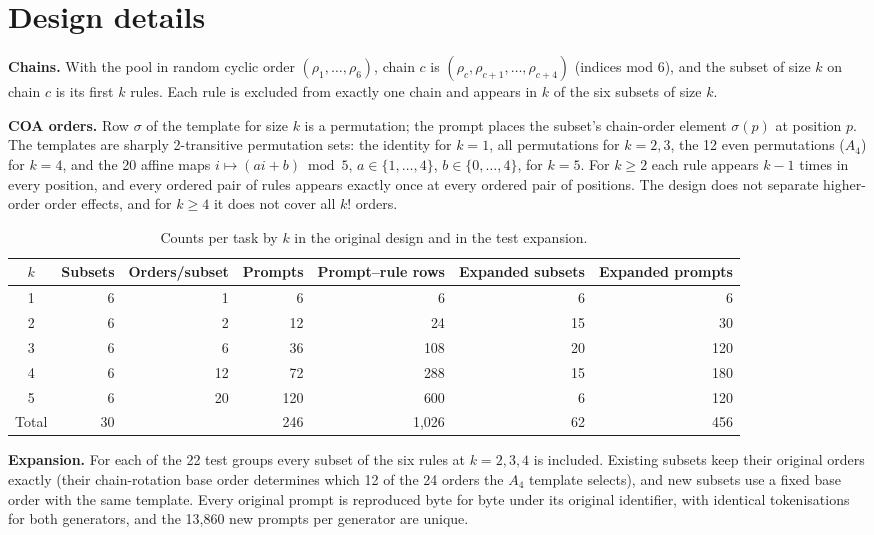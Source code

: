 \documentclass{article}
\begin{document}
\section{Design details}
\label{app:design}

\textbf{Chains.} With the pool in random cyclic order $(\rho_1,\dots,\rho_6)$, chain $c$ is $(\rho_c,\rho_{c+1},\dots,
\rho_{c+4})$ (indices mod 6), and the subset of size $k$ on chain $c$ is its first $k$ rules. Each rule is excluded from
exactly one chain and appears in $k$ of the six subsets of size $k$.

\textbf{COA orders.} Row $\sigma$ of the template for size $k$ is a permutation; the prompt places the subset's
chain-order element $\sigma(p)$ at position $p$. The templates are sharply 2-transitive permutation sets: the identity
for $k=1$, all permutations for $k=2,3$, the 12 even permutations ($A_4$) for $k=4$, and the 20 affine maps
$i\mapsto(ai+b)\bmod 5$, $a\in\{1,\dots,4\}$, $b\in\{0,\dots,4\}$, for $k=5$. For $k\ge2$ each rule appears $k-1$ times
in every position, and every ordered pair of rules appears exactly once at every ordered pair of positions. The design
does not separate higher-order order effects, and for $k\ge4$ it does not cover all $k!$ orders.

\begin{table}[h]
\centering\small
\caption{Counts per task by $k$ in the original design and in the test expansion.}
\label{tab:perk}
\setlength{\tabcolsep}{4pt}\footnotesize
\begin{tabular}{crrrrrr}
\toprule
$k$ & Subsets & Orders/subset & Prompts & Prompt--rule rows & Expanded subsets & Expanded prompts \\
\midrule
1 & 6 & 1 & 6 & 6 & 6 & 6 \\
2 & 6 & 2 & 12 & 24 & 15 & 30 \\
3 & 6 & 6 & 36 & 108 & 20 & 120 \\
4 & 6 & 12 & 72 & 288 & 15 & 180 \\
5 & 6 & 20 & 120 & 600 & 6 & 120 \\
\midrule
Total & 30 & & 246 & 1,026 & 62 & 456 \\
\bottomrule
\end{tabular}
\end{table}

\textbf{Expansion.} For each of the 22 test groups every subset of the six rules at $k=2,3,4$ is included. Existing
subsets keep their original orders exactly (their chain-rotation base order determines which 12 of the 24 orders the
$A_4$ template selects), and new subsets use a fixed base order with the same template. Every original prompt is
reproduced byte for byte under its original identifier, with identical tokenisations for both generators, and the
13,860 new prompts per generator are unique.
\end{document}
